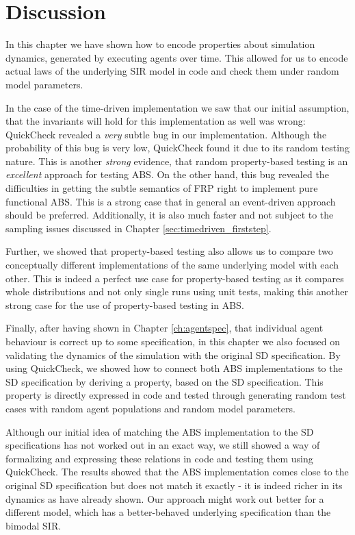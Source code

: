\section{Discussion}
In this chapter we have shown how to encode properties about simulation dynamics, generated by executing agents over time. This allowed for us to encode actual laws of the underlying SIR model in code and check them under random model parameters.

In the case of the time-driven implementation we saw that our initial assumption, that the invariants will hold for this implementation as well was wrong: QuickCheck revealed a \textit{very} subtle bug in our implementation. Although the probability of this bug is very low, QuickCheck found it due to its random testing nature. This is another \textit{strong} evidence, that random property-based testing is an \textit{excellent} approach for testing ABS. On the other hand, this bug revealed the difficulties in getting the subtle semantics of FRP right to implement pure functional ABS. This is a strong case that in general an event-driven approach should be preferred. Additionally, it is also much faster and not subject to the sampling issues discussed in Chapter \ref{sec:timedriven_firststep}.

Further, we showed that property-based testing also allows us to compare two conceptually different implementations of the same underlying model with each other. This is indeed a perfect use case for property-based testing as it compares whole distributions and not only single runs using unit tests, making this another strong case for the use of property-based testing in ABS.

Finally, after having shown in Chapter \ref{ch:agentspec}, that individual agent behaviour is correct up to some specification, in this chapter we also focused on validating the dynamics of the simulation with the original SD specification. By using QuickCheck, we showed how to connect both ABS implementations to the SD specification by deriving a property, based on the SD specification. This property is directly expressed in code and tested through generating random test cases with random agent populations and random model parameters. 

Although our initial idea of matching the ABS implementation to the SD specifications has not worked out in an exact way, we still showed a way of formalizing and expressing these relations in code and testing them using \\ QuickCheck. The results showed that the ABS implementation comes close to the original SD specification but does not match it exactly - it is indeed richer in its dynamics as \cite{figueredo_comparing_2014,macal_agent-based_2010} have already shown. Our approach might work out better for a different model, which has a better-behaved underlying specification than the bimodal SIR.


